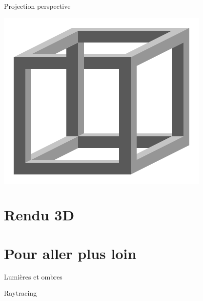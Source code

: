 \documentclass[compress]{beamer}
\begin{document}
\begin{frame}{Projection perspective}
    \begin{center}
    


    \end{center}
\end{frame}

\begin{frame}{}

\begin{center}
    \includegraphics[width=0.8\linewidth]{impossible_cube}
\end{center}

\end{frame}


\section{Rendu 3D}



\section{Pour aller plus loin}

\begin{frame}{Lumières et ombres}
\end{frame}

\begin{frame}{Raytracing}
\end{frame}
\end{document}
